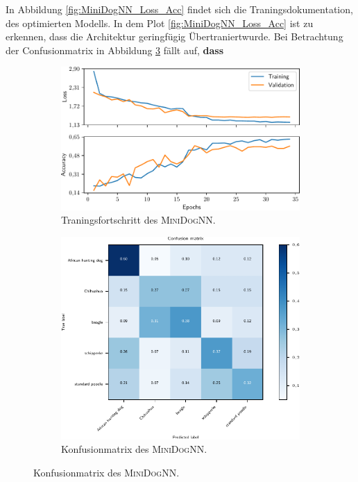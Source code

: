 In Abbildung \ref{fig:MiniDogNN_Loss_Acc} findet sich die Traningsdokumentation,
des optimierten Modells. In dem Plot \ref{fig:MiniDogNN_Loss_Acc} ist zu erkennen,
dass die Architektur geringfügig Übertraniertwurde.
Bei Betrachtung der Confusionmatrix in Abbildung \ref{fig:MiniDogNN_Konfusionmatrix} fällt auf, \textbf{dass}
\begin{figure}
\centering
\begin{subfigure}{0.48\textwidth}
\centering
\includegraphics[width = \textwidth]{../../final_data/MiniNN_n5/history.pdf}
\caption{Traningsfortschritt des \textsc{MiniDogNN}.}
\label{fig:MiniDog8NN_Loss_Acc}
\end{subfigure}
\begin{subfigure}{0.48\textwidth}
\centering
\includegraphics[width = \textwidth]{../../final_data/MiniNN_n5/confusion_matrix.pdf}
\caption{Konfusionmatrix des \textsc{MiniDogNN}.}
\label{fig:MiniDogNN_Konfusionmatrix}
\end{subfigure}
\end{figure}


